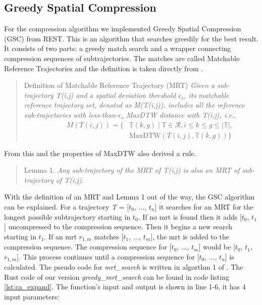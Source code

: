 \subsection{Greedy Spatial Compression}
For the compression algorithm we implemented Greedy Spatial Compression \break (GSC) from REST. This is an algorithm that searches greedily for the best result. It consists of two parts: a greedy match search and a wrapper connecting compression sequences of subtrajectories.
The matches are called Matchable Reference Trajectories and the definition is taken directly from \textcite{zhao2018rest}.
\begin{quote}
    Definition of Matchable Reference Trajectory (MRT) \textit{Given a sub-trajectory T(i,j) and a spatial deviation threshold $\epsilon_{s}$, its matchable reference trajectory set, denoted as M(T(i,j)), includes all the reference sub-trajectories with less-than-$\epsilon_{s}$ MaxDTW distance with T(i,j), i.e.,}
    \begin{align*}
        \hspace{1cm} M(T(i,j)) = \{ & \mathbb{T}(k,g) \mid \mathbb{T} \in \mathcal{R}, i \leq k \leq g \leq \left\lvert \mathbb{T} \right\rvert, \\
        \hspace{1cm}                & \text{MaxDTW}(T(i,j), \mathbb{T}(k,g)) \}
    \end{align*}
\end{quote}
From this and the properties of MaxDTW \textcite{zhao2018rest} also derived a rule.

\begin{quote}
    \label{lemma}
    Lemma 1. \textit{Any sub-trajectory of the MRT of T(i,j) is also an MRT of sub-trajectory of T(i,j).}
\end{quote}

With the definition of an MRT and Lemma 1 out of the way, the GSC algorithm can be explained.
For a trajectory \textit{T} = [$t_0$, ..., $t_n$] it searches for an MRT for the longest possible subtrajectory starting in $t_0$. If no \acrshort{mrt} is found then it adds [$t_0$, $t_1$] uncompressed to the compression sequence. Then it begins a new search starting in $t_1$. If an \acrshort{mrt} $r_{1,m}$ matches [$t_1$, ..., $t_m$], the \acrshort{mrt} is added to the compression sequence. The compression sequence for [$t_0$, ..., $t_m$] would be [$t_0$, $t_1$, $r_{1,m}$]. This process continues until a compression sequence for [$t_0$, ..., $t_n$] is calculated. The pseudo code for \textit{mrt\_search} is written in algorthm 1 of \textcite{zhao2018rest}. The Rust code of our version \textit{greedy\_mrt\_search} can be found in code listing \ref{lst:ca_expand}. The function's input and output is shown in line 1-6, it has 4 input parameters:

